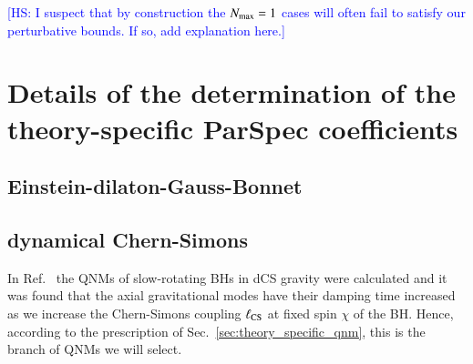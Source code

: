 \documentclass[twocolumn,
               prd,
               aps,
               superscriptaddress,
               tightenlines,
               nofootinbib,
               eqsecnum,
               amsfonts,
               amsmath,
               longbibliography]{revtex4-1}
\newcommand{\hs}[1]{{\textcolor{blue}{{[HS: #1]}} }}
\begin{document}
\hs{I suspect that by construction the $N_{\rm max} = 1$ cases will often fail to satisfy our
perturbative bounds. If so, add explanation here.}

%


\appendix

\section{Details of the determination of the theory-specific
ParSpec coefficients}
\label{app:map_details}

\subsection{Einstein-dilaton-Gauss-Bonnet}
\label{app:map_edgb}

\subsection{dynamical Chern-Simons}
\label{app:map_dcs}

%
In Ref.~\cite{Wagle:2021tam} the QNMs of slow-rotating BHs in dCS gravity were calculated
and it was found that the axial gravitational modes have their damping time increased as we
increase the Chern-Simons coupling $\ell_{\rm CS}$ at fixed spin $\chi$ of the BH.
%
Hence, according to the prescription of Sec.~\ref{sec:theory_specific_qnm}, this is the branch of QNMs we will select.
\end{document}
